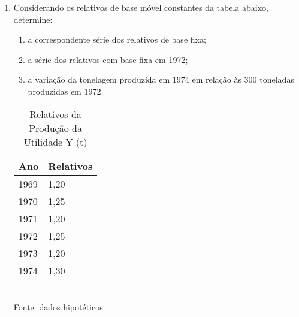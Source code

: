 \begin{enumerate}[resume]
\item Considerando os relativos de base móvel constantes da tabela abaixo, determine:
	\begin{enumerate}
	\item a correspondente série dos relativos de base fixa;
	\item a série dos relativos com base fixa em 1972;
	\item a variação da tonelagem produzida em 1974 em relação às 300 toneladas produzidas em 1972.
	\end{enumerate}
	\begin{table}[!htb]
	\centering
	\caption{Relativos da Produção da Utilidade Y (t)}
	\begin{tabular}{ll}
	Ano & Relativos \\
	\hline 
	1969 & 1,20 \\
	1970 & 1,25 \\
	1971 & 1,20 \\
	1972 & 1,25  \\
	1973 & 1,20  \\		
	1974 & 1,30  \\			
	\end{tabular} 
	\\ Fonte: dados hipotéticos
	\end{table}

\end{enumerate}